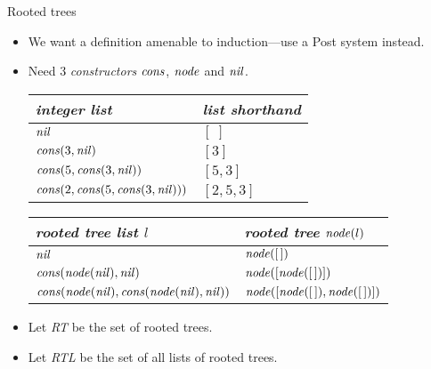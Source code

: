 \begin{wideslide}[bm=,toc=]{Rooted trees}
\begin{itemize}
\item We want a definition amenable to induction---use a Post system instead.
\item Need 3 {\em constructors\/} $\mbox{\it cons\/}$, $\mbox{\it node\/}$ and $\mbox{\it nil\/}$.

\vspace{1em}
\begin{tabular}{|ll|} \hline
{\em integer list\/} & {\em list shorthand} \\ \hline
$\mbox{\it nil\/}$ & $[\;]$ \\
$\mbox{\it cons\/}(3,\mbox{\it nil\/})$ & $[3]$ \\
$\mbox{\it cons\/}(5,\mbox{\it cons\/}(3,\mbox{\it nil\/}))$ & $[5,3]$ \\
$\mbox{\it cons\/}(2,\mbox{\it cons\/}(5,\mbox{\it cons\/}(3,\mbox{\it nil\/})))$ & $[2,5,3]$ \\ \hline
\end{tabular}

\vspace{1em}
\begin{tabular}{|ll|} \hline
{\em rooted tree list $l$\/} & {\em rooted tree} $\mbox{\it node\/}(l)$  \\ \hline
$\mbox{\it nil\/}$ & $\mbox{\it node\/}([\,])$ \\
$\mbox{\it cons\/}(\mbox{\it node\/}(\mbox{\it nil\/}),\mbox{\it nil\/})$ & 
$\mbox{\it node\/}([\mbox{\it node\/}([\,])])$ \\
$\mbox{\it cons\/}(\mbox{\it node\/}(\mbox{\it nil\/}),\mbox{\it cons\/}(\mbox{\it node\/}(\mbox{\it nil\/}),\mbox{\it nil\/}))$ &
$\mbox{\it node\/}(\left [\mbox{\it node\/}([\,]),\mbox{\it node\/}([\,]) \right])$ \\ \hline
\end{tabular}
\vspace{1em}
\item Let {\em RT\/} be the set of rooted trees.
\item Let {\em RTL\/} be the set of all lists of rooted trees.
\end{itemize}
\end{wideslide}

 
